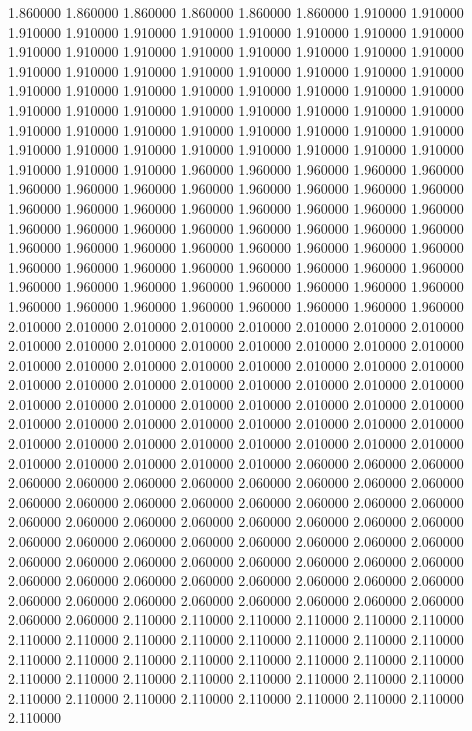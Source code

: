 1.860000
1.860000
1.860000
1.860000
1.860000
1.860000
1.910000
1.910000
1.910000
1.910000
1.910000
1.910000
1.910000
1.910000
1.910000
1.910000
1.910000
1.910000
1.910000
1.910000
1.910000
1.910000
1.910000
1.910000
1.910000
1.910000
1.910000
1.910000
1.910000
1.910000
1.910000
1.910000
1.910000
1.910000
1.910000
1.910000
1.910000
1.910000
1.910000
1.910000
1.910000
1.910000
1.910000
1.910000
1.910000
1.910000
1.910000
1.910000
1.910000
1.910000
1.910000
1.910000
1.910000
1.910000
1.910000
1.910000
1.910000
1.910000
1.910000
1.910000
1.910000
1.910000
1.910000
1.910000
1.910000
1.910000
1.910000
1.960000
1.960000
1.960000
1.960000
1.960000
1.960000
1.960000
1.960000
1.960000
1.960000
1.960000
1.960000
1.960000
1.960000
1.960000
1.960000
1.960000
1.960000
1.960000
1.960000
1.960000
1.960000
1.960000
1.960000
1.960000
1.960000
1.960000
1.960000
1.960000
1.960000
1.960000
1.960000
1.960000
1.960000
1.960000
1.960000
1.960000
1.960000
1.960000
1.960000
1.960000
1.960000
1.960000
1.960000
1.960000
1.960000
1.960000
1.960000
1.960000
1.960000
1.960000
1.960000
1.960000
1.960000
1.960000
1.960000
1.960000
1.960000
1.960000
1.960000
1.960000
2.010000
2.010000
2.010000
2.010000
2.010000
2.010000
2.010000
2.010000
2.010000
2.010000
2.010000
2.010000
2.010000
2.010000
2.010000
2.010000
2.010000
2.010000
2.010000
2.010000
2.010000
2.010000
2.010000
2.010000
2.010000
2.010000
2.010000
2.010000
2.010000
2.010000
2.010000
2.010000
2.010000
2.010000
2.010000
2.010000
2.010000
2.010000
2.010000
2.010000
2.010000
2.010000
2.010000
2.010000
2.010000
2.010000
2.010000
2.010000
2.010000
2.010000
2.010000
2.010000
2.010000
2.010000
2.010000
2.010000
2.010000
2.010000
2.010000
2.010000
2.010000
2.060000
2.060000
2.060000
2.060000
2.060000
2.060000
2.060000
2.060000
2.060000
2.060000
2.060000
2.060000
2.060000
2.060000
2.060000
2.060000
2.060000
2.060000
2.060000
2.060000
2.060000
2.060000
2.060000
2.060000
2.060000
2.060000
2.060000
2.060000
2.060000
2.060000
2.060000
2.060000
2.060000
2.060000
2.060000
2.060000
2.060000
2.060000
2.060000
2.060000
2.060000
2.060000
2.060000
2.060000
2.060000
2.060000
2.060000
2.060000
2.060000
2.060000
2.060000
2.060000
2.060000
2.060000
2.060000
2.060000
2.060000
2.060000
2.060000
2.060000
2.060000
2.110000
2.110000
2.110000
2.110000
2.110000
2.110000
2.110000
2.110000
2.110000
2.110000
2.110000
2.110000
2.110000
2.110000
2.110000
2.110000
2.110000
2.110000
2.110000
2.110000
2.110000
2.110000
2.110000
2.110000
2.110000
2.110000
2.110000
2.110000
2.110000
2.110000
2.110000
2.110000
2.110000
2.110000
2.110000
2.110000
2.110000
2.110000
2.110000
